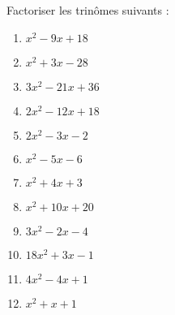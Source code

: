 \begin{exercice}
Factoriser les trinômes suivants :
\begin{multicols}{2}
\begin{enumerate}
\item ${{x}^{2}}-9x+18$ 
\item ${{x}^{2}}+3x-28$ 
\item $3{{x}^{2}}-21x+36$ 
\item $2{{x}^{2}}-12x+18$ 
\item $2{{x}^{2}}-3x-2$
\item ${{x}^{2}}-5x-6$
\item ${{x}^{2}}+4x+3$
\item ${{x}^{2}}+10x+20$
\item $3{{x}^{2}}-2x-4$
\item $18{{x}^{2}}+3x-1$
\item $4{{x}^{2}}-4x+1$
\item ${{x}^{2}}+x+1$
\end{enumerate}
\end{multicols}
\end{exercice}

